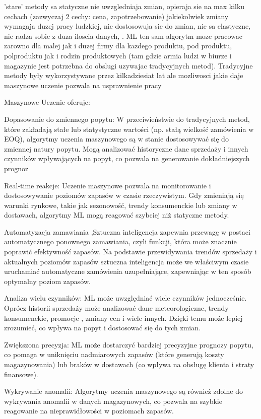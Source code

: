'stare' metody sa statyczne nie uwzgledniaja zmian, opieraja sie na max kilku cechach (zazwyczaj 2 cechy: cena, zapotrzebowanie) jakiekolwiek zmiany wymagaja duzej pracy ludzkiej, nie dostosowuja sie do zmian, nie sa elastyczne, nie radza sobie z duza iloscia danych, . ML ten sam algorytm moze pracowac zarowno dla malej jak i duzej firmy dla kazdego produktu, pod produktu, polproduktu jak i rodzin produktowych (tam gdzie armia ludzi w biurze i magazynie jest potrzebna do obslugi uzywajac tradycyjnych metod). Tradycyjne metody były wykorzystywane przez kilkadziesiat lat ale mozliwosci jakie daje maszynowe uczenie pozwala na usprawnienie pracy

Maszynowe Uczenie oferuje:

Dopasowanie do zmiennego popytu: W przeciwieństwie do tradycyjnych metod, które zakładają stałe lub statystyczne wartości (np. stałą wielkość zamówienia w EOQ), algorytmy uczenia maszynowego są w stanie dostosowywać się do zmiennej natury popytu. Mogą analizować historyczne dane sprzedaży i innych czynników wpływających na popyt, co pozwala na generowanie dokładniejszych prognoz

Real-time reakcje: Uczenie maszynowe pozwala na monitorowanie i dostosowywanie poziomów zapasów w czasie rzeczywistym. Gdy zmieniają się warunki rynkowe, takie jak sezonowość, trendy konsumenckie lub zmiany w dostawach, algorytmy ML mogą reagować szybciej niż statyczne metody.

Automatyzacja zamawiania ,Sztuczna inteligencja zapewnia przewagę w postaci automatycznego ponownego zamawiania, czyli funkcji, która może znacznie poprawić efektywność zapasów. Na podstawie przewidywania trendów sprzedaży i aktualnych poziomów zapasów sztuczna inteligencja może we właściwym czasie uruchamiać automatyczne zamówienia uzupełniające, zapewniając w ten sposób optymalny poziom zapasów.

Analiza wielu czynników: ML może uwzględniać wiele czynników jednocześnie. Oprócz historii sprzedaży może analizować dane meteorologiczne, trendy konsumenckie, promocje , zmiany cen i wiele innych. Dzięki temu może lepiej zrozumieć, co wpływa na popyt i dostosować się do tych zmian.

Zwiększona precyzja: ML może dostarczyć bardziej precyzyjne prognozy popytu, co pomaga w uniknięciu nadmiarowych zapasów (które generują koszty magazynowania) lub braków w dostawach (co wpływa na obsługę klienta i straty finansowe).

Wykrywanie anomalii: Algorytmy uczenia maszynowego są również zdolne do wykrywania anomalii w danych magazynowych, co pozwala na szybkie reagowanie na nieprawidłowości w poziomach zapasów.


